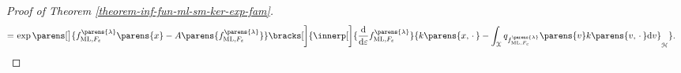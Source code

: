 \begin{proof}[Proof of Theorem \ref{theorem-inf-fun-ml-sm-ker-exp-fam}]
\begin{align*}
		= & \, \exp \parens[\big]{f_{\ML, F_{\varepsilon}}^{\parens{\lambda}} \parens{x} - A \parens{f_{\ML, F_{\varepsilon}}^{\parens{\lambda}}}} \bracks[\bigg]{ \innerp[\bigg]{ \frac{\diff}{\diff \varepsilon} f_{\ML, F_{\varepsilon}}^{\parens{\lambda}}}{ k \parens{x, \,\cdot\,} - \int_{\calX} q_{f_{\ML, F_{\varepsilon}}^{\parens{\lambda}}} \parens{v} k \parens{v, \,\cdot\,} \diff v}_{\calH} }. 
	\end{align*}
	

\end{proof}
